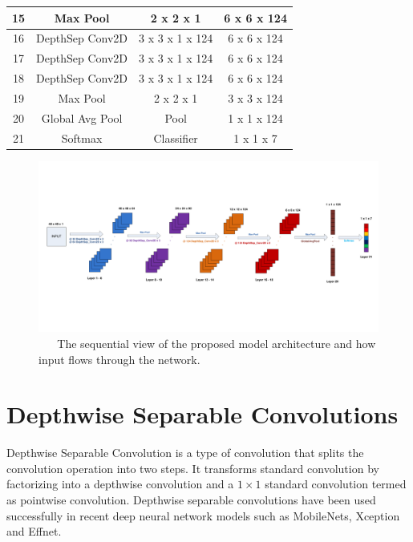 \documentclass[master]{thesis-uestc}
\begin{document}
\begin{table}[ht]
\begin{center}
\begin{tabular}{|c|c|c|c|}
15 & Max Pool & 2 x 2 x 1 & 6 x 6 x 124\\ \hline

16 & DepthSep Conv2D & 3 x 3 x 1 x 124 & 6 x 6 x 124\\ \hline
17 & DepthSep Conv2D & 3 x 3 x 1 x 124 & 6 x 6 x 124\\ \hline
18 & DepthSep Conv2D & 3 x 3 x 1 x 124 & 6 x 6 x 124\\ \hline

19 & Max Pool & 2 x 2 x 1 & 3 x 3 x 124\\ \hline

20 & Global Avg Pool & Pool & 1 x 1 x 124\\ \hline
21 & Softmax & Classifier & 1 x 1 x 7\\ \hline

\end{tabular}
\end{center}
\end{table}

\begin{figure}[ht]
\includegraphics[width=6in]{pic/sequence_model_architecture.pdf}
\caption{\,\,\,\,\,\,\,\,\,\,The sequential view of the proposed model architecture and how input flows through the network.}
\label{sequence_model_arch}
\end{figure}

\section{Depthwise Separable Convolutions}\label{depthconve}
Depthwise Separable Convolution is a type of convolution that splits the convolution operation into two steps. It transforms standard convolution by factorizing into a depthwise convolution and a $1 \times 1$ standard convolution termed as pointwise convolution. Depthwise separable convolutions have been used successfully in recent deep neural network models such as MobileNets\cite{DBLP:journals/corr/HowardZCKWWAA17}, Xception\cite{DBLP:journals/corr/Chollet16a} and Effnet\cite{8451339}.
\end{document}
